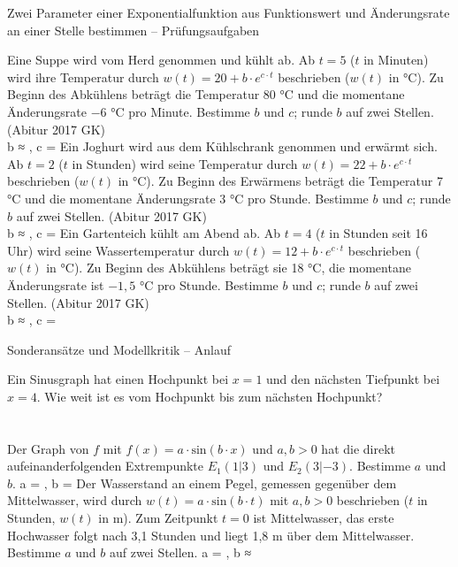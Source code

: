 \begin{aufgabe}{Zwei Parameter einer Exponentialfunktion aus Funktionswert und Änderungsrate an einer Stelle bestimmen – Prüfungsaufgaben}
\begin{teile}
\teil Eine Suppe wird vom Herd genommen und kühlt ab. Ab $t = 5$ ($t$ in Minuten) wird ihre Temperatur durch $w(t) = 20 + b \cdot e^{c \cdot t}$ beschrieben ($w(t)$ in °C). Zu Beginn des Abkühlens beträgt die Temperatur 80 °C und die momentane Änderungsrate $-6$ °C pro Minute. Bestimme $b$ und $c$; runde $b$ auf zwei Stellen. \hfill (Abitur 2017 GK) \\ b ≈ \leerfeld , c = \leerfeld
\teil Ein Joghurt wird aus dem Kühlschrank genommen und erwärmt sich. Ab $t = 2$ ($t$ in Stunden) wird seine Temperatur durch $w(t) = 22 + b \cdot e^{c \cdot t}$ beschrieben ($w(t)$ in °C). Zu Beginn des Erwärmens beträgt die Temperatur 7 °C und die momentane Änderungsrate 3 °C pro Stunde. Bestimme $b$ und $c$; runde $b$ auf zwei Stellen. \hfill (Abitur 2017 GK) \\ b ≈ \leerfeld , c = \leerfeld
\teil Ein Gartenteich kühlt am Abend ab. Ab $t = 4$ ($t$ in Stunden seit 16 Uhr) wird seine Wassertemperatur durch $w(t) = 12 + b \cdot e^{c \cdot t}$ beschrieben ($w(t)$ in °C). Zu Beginn des Abkühlens beträgt sie 18 °C, die momentane Änderungsrate ist $-1{,}5$ °C pro Stunde. Bestimme $b$ und $c$; runde $b$ auf zwei Stellen. \hfill (Abitur 2017 GK) \\ b ≈ \leerfeld , c = \leerfeld
\end{teile}
\end{aufgabe}

\begin{aufgabe}{Sonderansätze und Modellkritik – Anlauf}
\begin{teile}
\teil Ein Sinusgraph hat einen Hochpunkt bei $x = 1$ und den nächsten Tiefpunkt bei $x = 4$. Wie weit ist es vom Hochpunkt bis zum nächsten Hochpunkt? \\  \\  \\ 
\teil Der Graph von $f$ mit $f(x) = a \cdot \mathrm{sin}(b \cdot x)$ und $a, b > 0$ hat die direkt aufeinanderfolgenden Extrempunkte $E_1(1|3)$ und $E_2(3|-3)$. Bestimme $a$ und $b$. a = \leerfeld , b = \leerfeld
\teil Der Wasserstand an einem Pegel, gemessen gegenüber dem Mittelwasser, wird durch $w(t) = a \cdot \mathrm{sin}(b \cdot t)$ mit $a, b > 0$ beschrieben ($t$ in Stunden, $w(t)$ in m). Zum Zeitpunkt $t = 0$ ist Mittelwasser, das erste Hochwasser folgt nach 3,1 Stunden und liegt 1,8 m über dem Mittelwasser. Bestimme $a$ und $b$ auf zwei Stellen. a = \leerfeld , b ≈ \leerfeld
\end{teile}
\end{aufgabe}

